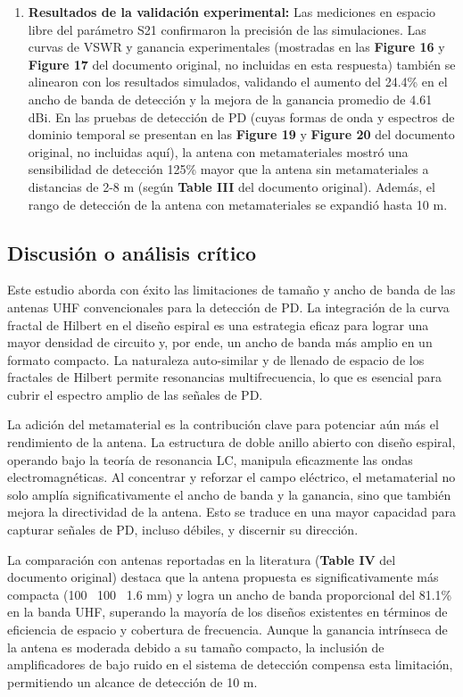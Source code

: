 \begin{enumerate}
    \item \textbf{Resultados de la validación experimental:}
    Las mediciones en espacio libre del parámetro S21 confirmaron la precisión de las simulaciones. Las curvas de VSWR y ganancia experimentales (mostradas en las \textbf{Figure 16} y \textbf{Figure 17} del documento original, no incluidas en esta respuesta) también se alinearon con los resultados simulados, validando el aumento del 24.4\% en el ancho de banda de detección y la mejora de la ganancia promedio de 4.61 dBi.
    En las pruebas de detección de PD (cuyas formas de onda y espectros de dominio temporal se presentan en las \textbf{Figure 19} y \textbf{Figure 20} del documento original, no incluidas aquí), la antena con metamateriales mostró una sensibilidad de detección 125\% mayor que la antena sin metamateriales a distancias de 2-8 m (según \textbf{Table III} del documento original). Además, el rango de detección de la antena con metamateriales se expandió hasta 10 m.
\end{enumerate}

\subsection*{Discusión o análisis crítico}
Este estudio aborda con éxito las limitaciones de tamaño y ancho de banda de las antenas UHF convencionales para la detección de PD. La integración de la curva fractal de Hilbert en el diseño espiral es una estrategia eficaz para lograr una mayor densidad de circuito y, por ende, un ancho de banda más amplio en un formato compacto. La naturaleza auto-similar y de llenado de espacio de los fractales de Hilbert permite resonancias multifrecuencia, lo que es esencial para cubrir el espectro amplio de las señales de PD.

La adición del metamaterial es la contribución clave para potenciar aún más el rendimiento de la antena. La estructura de doble anillo abierto con diseño espiral, operando bajo la teoría de resonancia LC, manipula eficazmente las ondas electromagnéticas. Al concentrar y reforzar el campo eléctrico, el metamaterial no solo amplía significativamente el ancho de banda y la ganancia, sino que también mejora la directividad de la antena. Esto se traduce en una mayor capacidad para capturar señales de PD, incluso débiles, y discernir su dirección.

La comparación con antenas reportadas en la literatura (\textbf{Table IV} del documento original) destaca que la antena propuesta es significativamente más compacta (100 \texttimes\ 100 \texttimes\ 1.6 mm) y logra un ancho de banda proporcional del 81.1\% en la banda UHF, superando la mayoría de los diseños existentes en términos de eficiencia de espacio y cobertura de frecuencia. Aunque la ganancia intrínseca de la antena es moderada debido a su tamaño compacto, la inclusión de amplificadores de bajo ruido en el sistema de detección compensa esta limitación, permitiendo un alcance de detección de 10 m.

